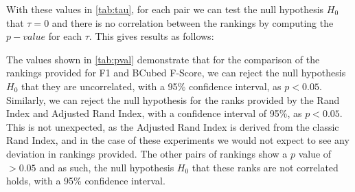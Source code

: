 \documentclass{uvamscse}	%
\begin{document}
With these values in \autoref{tab:tau}, for each pair we can test the null hypothesis $H_0$ that $\tau = 0$ and there is no correlation between the rankings by computing the $p-value$ for each $\tau$. This gives results as follows:

\begin{table}[h]
\centering
{}
\caption{Calculated $p$ values for Kendall's Tau tests}
\label{tab:pval}
\end{table}

The values shown in \autoref{tab:pval} demonstrate that for the comparison of the rankings provided for F1 and BCubed F-Score, we can reject the null hypothesis $H_0$ that they are uncorrelated, with a 95\% confidence interval, as $p < 0.05$. Similarly, we can reject the null hypothesis for the ranks provided by the Rand Index and Adjusted Rand Index, with a confidence interval of 95\%, as $p < 0.05$. This is not unexpected, as the Adjusted Rand Index is derived from the classic Rand Index, and in the case of these experiments we would not expect to see any deviation in rankings provided. The other pairs of rankings show a $p$ value of $> 0.05$ and as such, the null hypothesis $H_0$ that these ranks are not correlated holds, with a 95\% confidence interval.
\end{document}
